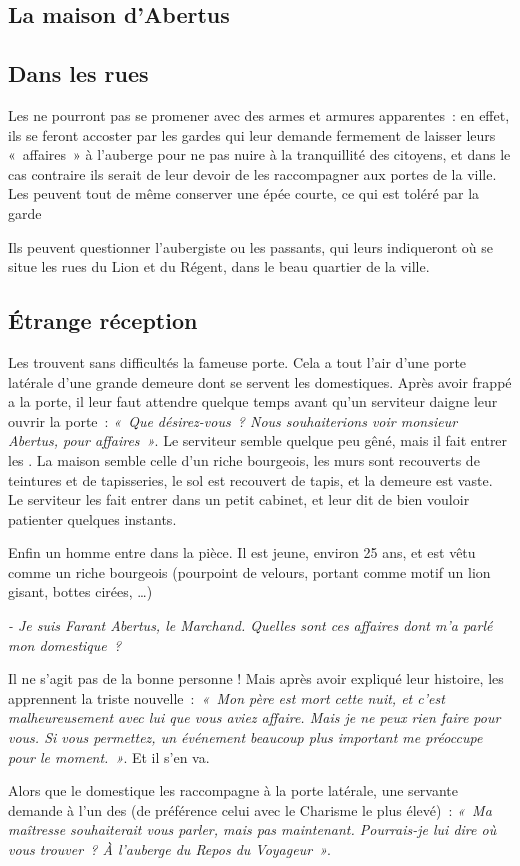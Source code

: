 \documentclass[a4paper,10pt,openany]{book}
\begin{document}
\begin{multicols}{2}
\section{La maison d’Abertus}
\subsection{Dans les rues}
Les \PJs ne pourront pas se promener avec des armes et armures apparentes : en effet, ils se feront accoster par les gardes qui leur demande
fermement de laisser leurs « affaires » à l’auberge pour ne pas nuire à la tranquillité des citoyens, et dans le cas contraire ils serait de leur
devoir de les raccompagner aux portes de la ville. Les \PJs peuvent tout de même conserver une épée courte, ce qui est toléré par la garde\par
Ils peuvent questionner l’aubergiste ou les passants, qui leurs indiqueront où se situe les rues du Lion et du Régent, dans le beau quartier de la
ville.
\subsection{Étrange réception}
Les \PJs trouvent sans difficultés la fameuse porte. Cela a tout l’air d’une porte latérale d’une grande demeure dont se servent les
domestiques. Après avoir frappé a la porte, il leur faut attendre quelque temps avant qu’un serviteur daigne leur ouvrir la porte : \emph{« Que
désirez-vous ? Nous souhaiterions voir monsieur Abertus, pour affaires »}. Le serviteur semble quelque peu gêné, mais il fait entrer les \PJs.
La maison semble celle d’un riche bourgeois, les murs sont recouverts de teintures et de tapisseries, le sol est recouvert de tapis, et la demeure est
vaste. Le serviteur les fait entrer dans un petit cabinet, et leur dit de bien vouloir patienter quelques instants.\par Enfin un homme entre dans la
pièce. Il est jeune, environ 25 ans, et est vêtu comme un riche bourgeois (pourpoint de velours, portant comme motif un lion gisant, bottes cirées,
\ldots)\par \emph{- Je suis Farant Abertus, le Marchand. Quelles sont ces affaires dont m’a parlé mon domestique ?}\par Il ne s’agit pas de la bonne
personne ! Mais après avoir expliqué leur histoire, les \PJs apprennent la triste nouvelle : \emph{« Mon père est mort cette nuit, et c’est
malheureusement avec lui que vous aviez affaire. Mais je ne peux rien faire pour vous. Si vous permettez, un événement beaucoup plus important me
préoccupe pour le moment. »}. Et il s’en va.\par Alors que le domestique les raccompagne à la porte latérale, une servante demande à l’un des
\PJs (de préférence celui avec le Charisme le plus élevé) : \emph{« Ma maîtresse souhaiterait vous parler, mais pas maintenant. Pourrais-je lui
dire où vous trouver ? À l’auberge du Repos du Voyageur »}.

\end{multicols}
\end{document}
